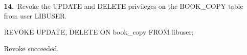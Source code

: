 \noindent\begin{minipage}{\linewidth}
\begingroup{}
{\fontsize{14}{17}\selectfont\textbf{14.}}\ Revoke the UPDATE and DELETE privileges on the BOOK\_COPY table from user LIBUSER.\par
\endgroup\vspace{12pt}


\begin{sqlcode}
REVOKE UPDATE, DELETE ON book_copy FROM libuser;
\end{sqlcode}

\vspace{18pt}


\begin{sqlout}[fontsize=\small]
Revoke succeeded.
\end{sqlout}
\end{minipage}\par\vspace{24pt}

